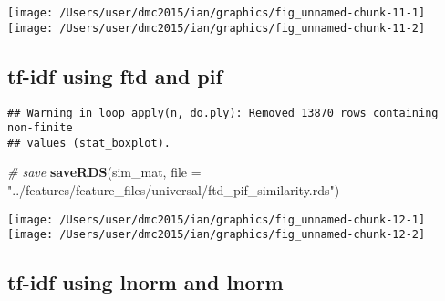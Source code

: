 \documentclass[10pt]{report}
\newenvironment{Shaded}{}{}
\newcommand{\KeywordTok}[1]{\textcolor[rgb]{0.00,0.44,0.13}{\textbf{{#1}}}}
\newcommand{\DataTypeTok}[1]{\textcolor[rgb]{0.56,0.13,0.00}{{#1}}}
\newcommand{\StringTok}[1]{\textcolor[rgb]{0.25,0.44,0.63}{{#1}}}
\newcommand{\CommentTok}[1]{\textcolor[rgb]{0.38,0.63,0.69}{\textit{{#1}}}}
\newcommand{\NormalTok}[1]{{#1}}
\begin{document}
\begin{center}\texttt{[image: /Users/user/dmc2015/ian/graphics/fig\_unnamed-chunk-11-1]} \texttt{[image: /Users/user/dmc2015/ian/graphics/fig\_unnamed-chunk-11-2]} \end{center}

\subsection{tf-idf using ftd and pif}\label{tf-idf-using-ftd-and-pif}

\begin{Shaded}
\end{Shaded}

\begin{verbatim}
## Warning in loop_apply(n, do.ply): Removed 13870 rows containing non-finite
## values (stat_boxplot).
\end{verbatim}

\begin{Shaded}
\begin{Highlighting}[]
\CommentTok{# save}
\KeywordTok{saveRDS}\NormalTok{(sim_mat, }\DataTypeTok{file =} \StringTok{"../features/feature_files/universal/ftd_pif_similarity.rds"}\NormalTok{)}
\end{Highlighting}
\end{Shaded}

\begin{center}\texttt{[image: /Users/user/dmc2015/ian/graphics/fig\_unnamed-chunk-12-1]} \texttt{[image: /Users/user/dmc2015/ian/graphics/fig\_unnamed-chunk-12-2]} \end{center}

\subsection{tf-idf using lnorm and
lnorm}\label{tf-idf-using-lnorm-and-lnorm}
\end{document}
